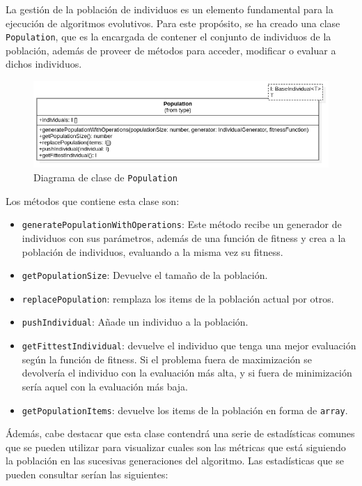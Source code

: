 La gestión de la población de individuos es un elemento fundamental para la ejecución de algoritmos evolutivos. Para este propósito, se ha creado una clase \texttt{Population}, que es la encargada de contener el conjunto de individuos de la población, además de proveer de métodos para acceder, modificar o evaluar a dichos individuos. \\

\begin{figure}[ht]
    \centering
    \includegraphics[scale=0.6]{mem/images/cap-4/4.2.4(Population)/Population.png}
    \caption{Diagrama de clase de \texttt{Population}}
    \label{fig:generator-uml}
\end{figure}


Los métodos que contiene esta clase son:

\begin{itemize}
    \item \texttt{generatePopulationWithOperations}: Este método recibe un generador de individuos con sus parámetros, además de una función de fitness y crea a la población de individuos, evaluando a la misma vez su fitness.
    \item \texttt{getPopulationSize}: Devuelve el tamaño de la población.
    \item \texttt{replacePopulation}: remplaza los items de la población actual por otros.
    \item \texttt{pushIndividual}: Añade un individuo a la población.
    \item \texttt{getFittestIndividual}: devuelve el individuo que tenga una mejor evaluación según la función de fitness. Si el problema fuera de maximización se devolvería el individuo con la evaluación más alta, y si fuera de minimización sería aquel con la evaluación más baja.
    \item \texttt{getPopulationItems}: devuelve los items de la población en forma de \texttt{array}.
\end{itemize}

Ádemás, cabe destacar que esta clase contendrá una serie de estadísticas comunes que se pueden utilizar para visualizar cuales son las métricas que está siguiendo la población en las sucesivas generaciones del algoritmo. Las estadísticas que se pueden consultar serían las siguientes:


